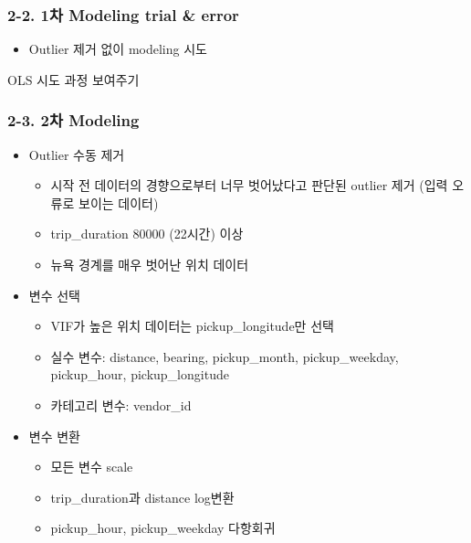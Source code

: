 \documentclass[11pt]{article}
\providecommand{\tightlist}{%
      \setlength{\itemsep}{0pt}\setlength{\parskip}{0pt}}
\begin{document}
    \hypertarget{uxcc28-modeling-trial-error}{%
\subsubsection{2-2. 1차 Modeling trial \&
error}\label{uxcc28-modeling-trial-error}}

\begin{itemize}
\tightlist
\item
  Outlier 제거 없이 modeling 시도
\end{itemize}

    OLS 시도 과정 보여주기

    \hypertarget{uxcc28-modeling}{%
\subsubsection{2-3. 2차 Modeling}\label{uxcc28-modeling}}

\begin{itemize}
\tightlist
\item
  Outlier 수동 제거

  \begin{itemize}
  \tightlist
  \item
    시작 전 데이터의 경향으로부터 너무 벗어났다고 판단된 outlier 제거
    (입력 오류로 보이는 데이터)
  \item
    trip\_duration 80000 (22시간) 이상
  \item
    뉴욕 경계를 매우 벗어난 위치 데이터
  \end{itemize}
\item
  변수 선택

  \begin{itemize}
  \tightlist
  \item
    VIF가 높은 위치 데이터는 pickup\_longitude만 선택
  \item
    실수 변수: distance, bearing, pickup\_month, pickup\_weekday,
    pickup\_hour, pickup\_longitude
  \item
    카테고리 변수: vendor\_id
  \end{itemize}
\item
  변수 변환

  \begin{itemize}
  \tightlist
  \item
    모든 변수 scale
  \item
    trip\_duration과 distance log변환
  \item
    pickup\_hour, pickup\_weekday 다항회귀
  \end{itemize}
\end{itemize}
\end{document}
